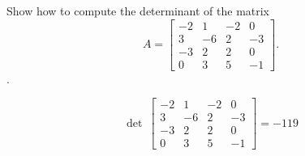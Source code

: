 
\begin{exerciseStatement}


Show how to compute the determinant of the matrix \[A= \left[\begin{array}{cccc}
-2 & 1 & -2 & 0 \\
3 & -6 & 2 & -3 \\
-3 & 2 & 2 & 0 \\
0 & 3 & 5 & -1
\end{array}\right] .\].


\end{exerciseStatement}
    
\begin{exerciseAnswer} 
\[\operatorname{det}\  \left[\begin{array}{cccc}
-2 & 1 & -2 & 0 \\
3 & -6 & 2 & -3 \\
-3 & 2 & 2 & 0 \\
0 & 3 & 5 & -1
\end{array}\right] = -119 \]
\end{exerciseAnswer}
    
